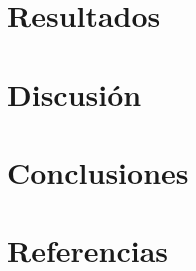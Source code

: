 \documentclass[11pt,]{article}
\begin{document}
\break

\hypertarget{resultados}{%
\section{Resultados}\label{resultados}}

\break

\hypertarget{discusion}{%
\section{Discusión}\label{discusion}}

\break

\hypertarget{conclusiones}{%
\section{Conclusiones}\label{conclusiones}}

\break

\hypertarget{referencias}{%
\section{Referencias}\label{referencias}}
\end{document}
